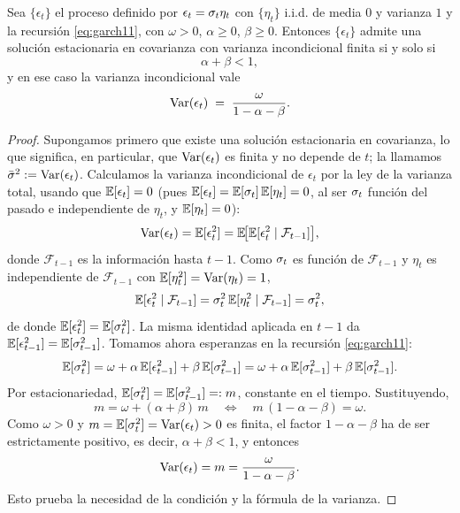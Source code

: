 \begin{teorema}
\label{teo:garch-estac}
Sea $\{\epsilon_t\}$ el proceso definido por $\epsilon_t = \sigma_t \eta_t$ con $\{\eta_t\}$ i.i.d. de media $0$ y varianza $1$ y la recursión \eqref{eq:garch11}, con $\omega > 0$, $\alpha \ge 0$, $\beta \ge 0$. Entonces $\{\epsilon_t\}$ admite una solución estacionaria en covarianza con varianza incondicional finita si y solo si
\[
\alpha + \beta < 1,
\]
y en ese caso la varianza incondicional vale
\[
\operatorname{Var}(\epsilon_t) \;=\; \frac{\omega}{1 - \alpha - \beta}.
\]
\end{teorema}

\begin{proof}
Supongamos primero que existe una solución estacionaria en covarianza, lo que significa, en particular, que $\operatorname{Var}(\epsilon_t)$ es finita y no depende de $t$; la llamamos $\bar{\sigma}^2 := \operatorname{Var}(\epsilon_t)$. Calculamos la varianza incondicional de $\epsilon_t$ por la ley de la varianza total, usando que $\mathbb{E}[\epsilon_t] = 0$ (pues $\mathbb{E}[\epsilon_t] = \mathbb{E}[\sigma_t]\,\mathbb{E}[\eta_t] = 0$, al ser $\sigma_t$ función del pasado e independiente de $\eta_t$, y $\mathbb{E}[\eta_t]=0$):
\[
\operatorname{Var}(\epsilon_t) = \mathbb{E}[\epsilon_t^2] = \mathbb{E}\!\big[\mathbb{E}[\epsilon_t^2 \mid \mathcal{F}_{t-1}]\big],
\]
donde $\mathcal{F}_{t-1}$ es la información hasta $t-1$. Como $\sigma_t$ es función de $\mathcal{F}_{t-1}$ y $\eta_t$ es independiente de $\mathcal{F}_{t-1}$ con $\mathbb{E}[\eta_t^2] = \operatorname{Var}(\eta_t) = 1$,
\[
\mathbb{E}[\epsilon_t^2 \mid \mathcal{F}_{t-1}] = \sigma_t^2\, \mathbb{E}[\eta_t^2 \mid \mathcal{F}_{t-1}] = \sigma_t^2,
\]
de donde $\mathbb{E}[\epsilon_t^2] = \mathbb{E}[\sigma_t^2]$. La misma identidad aplicada en $t-1$ da $\mathbb{E}[\epsilon_{t-1}^2] = \mathbb{E}[\sigma_{t-1}^2]$. Tomamos ahora esperanzas en la recursión \eqref{eq:garch11}:
\[
\mathbb{E}[\sigma_t^2] = \omega + \alpha\, \mathbb{E}[\epsilon_{t-1}^2] + \beta\, \mathbb{E}[\sigma_{t-1}^2]
= \omega + \alpha\, \mathbb{E}[\sigma_{t-1}^2] + \beta\, \mathbb{E}[\sigma_{t-1}^2].
\]
Por estacionariedad, $\mathbb{E}[\sigma_t^2] = \mathbb{E}[\sigma_{t-1}^2] =: m$, constante en el tiempo. Sustituyendo,
\[
m = \omega + (\alpha + \beta)\, m
\quad\Longleftrightarrow\quad
m\,(1 - \alpha - \beta) = \omega.
\]
Como $\omega > 0$ y $m = \mathbb{E}[\sigma_t^2] = \operatorname{Var}(\epsilon_t) > 0$ es finita, el factor $1 - \alpha - \beta$ ha de ser estrictamente positivo, es decir, $\alpha + \beta < 1$, y entonces
\[
\operatorname{Var}(\epsilon_t) = m = \frac{\omega}{1 - \alpha - \beta}.
\]
Esto prueba la necesidad de la condición y la fórmula de la varianza.


\end{proof}
